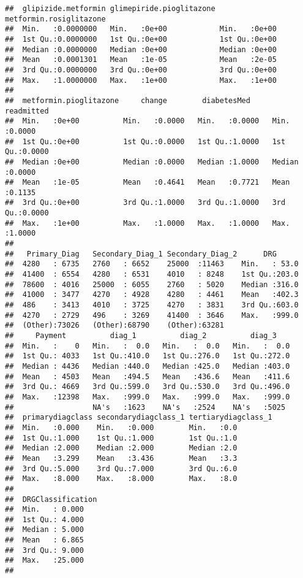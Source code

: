\documentclass[11pt,]{article}
\begin{document}
\begin{verbatim}
##  glipizide.metformin glimepiride.pioglitazone metformin.rosiglitazone
##  Min.   :0.0000000   Min.   :0e+00            Min.   :0e+00          
##  1st Qu.:0.0000000   1st Qu.:0e+00            1st Qu.:0e+00          
##  Median :0.0000000   Median :0e+00            Median :0e+00          
##  Mean   :0.0001301   Mean   :1e-05            Mean   :2e-05          
##  3rd Qu.:0.0000000   3rd Qu.:0e+00            3rd Qu.:0e+00          
##  Max.   :1.0000000   Max.   :1e+00            Max.   :1e+00          
##                                                                      
##  metformin.pioglitazone     change        diabetesMed       readmitted    
##  Min.   :0e+00          Min.   :0.0000   Min.   :0.0000   Min.   :0.0000  
##  1st Qu.:0e+00          1st Qu.:0.0000   1st Qu.:1.0000   1st Qu.:0.0000  
##  Median :0e+00          Median :0.0000   Median :1.0000   Median :0.0000  
##  Mean   :1e-05          Mean   :0.4641   Mean   :0.7721   Mean   :0.1135  
##  3rd Qu.:0e+00          3rd Qu.:1.0000   3rd Qu.:1.0000   3rd Qu.:0.0000  
##  Max.   :1e+00          Max.   :1.0000   Max.   :1.0000   Max.   :1.0000  
##                                                                           
##   Primary_Diag   Secondary_Diag_1 Secondary_Diag_2      DRG       
##  4280   : 6735   2760   : 6652    25000  :11463    Min.   : 53.0  
##  41400  : 6554   4280   : 6531    4010   : 8248    1st Qu.:203.0  
##  78600  : 4016   25000  : 6055    2760   : 5020    Median :316.0  
##  41000  : 3477   4270   : 4928    4280   : 4461    Mean   :402.3  
##  486    : 3413   4010   : 3725    4270   : 3831    3rd Qu.:603.0  
##  4270   : 2729   496    : 3269    41400  : 3646    Max.   :999.0  
##  (Other):73026   (Other):68790    (Other):63281                   
##     Payment          diag_1          diag_2          diag_3     
##  Min.   :    0   Min.   :  0.0   Min.   :  0.0   Min.   :  0.0  
##  1st Qu.: 4033   1st Qu.:410.0   1st Qu.:276.0   1st Qu.:272.0  
##  Median : 4436   Median :440.0   Median :425.0   Median :403.0  
##  Mean   : 4503   Mean   :494.5   Mean   :436.6   Mean   :411.6  
##  3rd Qu.: 4669   3rd Qu.:599.0   3rd Qu.:530.0   3rd Qu.:496.0  
##  Max.   :12398   Max.   :999.0   Max.   :999.0   Max.   :999.0  
##                  NA's   :1623    NA's   :2524    NA's   :5025   
##  primarydiagclass secondarydiagclass_1 tertiarydiagclass_1
##  Min.   :0.000    Min.   :0.000        Min.   :0.0        
##  1st Qu.:1.000    1st Qu.:1.000        1st Qu.:1.0        
##  Median :2.000    Median :2.000        Median :2.0        
##  Mean   :3.299    Mean   :3.436        Mean   :3.3        
##  3rd Qu.:5.000    3rd Qu.:7.000        3rd Qu.:6.0        
##  Max.   :8.000    Max.   :8.000        Max.   :8.0        
##                                                           
##  DRGClassification
##  Min.   : 0.000   
##  1st Qu.: 4.000   
##  Median : 5.000   
##  Mean   : 6.865   
##  3rd Qu.: 9.000   
##  Max.   :25.000   
## 
\end{verbatim}
\end{document}

